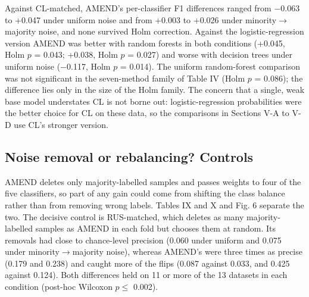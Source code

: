 \documentclass[conference]{IEEEtran}
\begin{document}
Against CL-matched, AMEND's per-classifier F1 differences ranged from $-$0.063 to +0.047 under uniform noise and from +0.003 to +0.026 under minority$\rightarrow $majority noise, and none survived Holm correction. Against the logistic-regression version AMEND was better with random forests in both conditions (+0.045, Holm $p$ = 0.043; +0.038, Holm $p$ = 0.027) and worse with decision trees under uniform noise ($-$0.117, Holm $p$ = 0.014). The uniform random-forest comparison was not significant in the seven-method family of Table IV (Holm $p$ = 0.086); the difference lies only in the size of the Holm family. The concern that a single, weak base model understates CL is not borne out: logistic-regression probabilities were the better choice for CL on these data, so the comparisons in Sections V-A to V-D use CL's stronger version.

\subsection{Noise removal or rebalancing? Controls}\label{sec:noise-removal-or-rebalancing-controls}

AMEND deletes only majority-labelled samples and passes weights to four of the five classifiers, so part of any gain could come from shifting the class balance rather than from removing wrong labels. Tables IX and X and Fig. 6 separate the two. The decisive control is RUS-matched, which deletes as many majority-labelled samples as AMEND in each fold but chooses them at random. Its removals had close to chance-level precision (0.060 under uniform and 0.075 under minority$\rightarrow $majority noise), whereas AMEND's were three times as precise (0.179 and 0.238) and caught more of the flips (0.087 against 0.033, and 0.425 against 0.124). Both differences held on 11 or more of the 13 datasets in each condition (post-hoc Wilcoxon $p \le $ 0.002).
\end{document}

